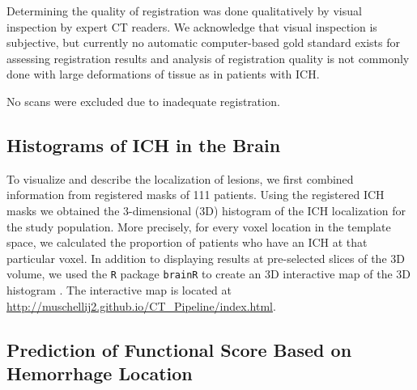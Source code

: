 \documentclass[10pt]{article}\usepackage[]{graphicx}\usepackage[]{color}
\begin{document}
Determining the quality of registration was done qualitatively by visual inspection by expert CT readers.   We acknowledge that visual inspection is subjective, but currently no automatic computer-based gold standard exists for assessing
registration results and analysis of registration quality is not commonly done with large deformations of tissue as in patients with ICH.  

No scans were excluded due to inadequate registration.





\subsection{Histograms of ICH in the Brain}

To visualize and describe the localization of lesions, we first combined information from registered masks of 111 patients.  Using the registered ICH masks we obtained the $3$-dimensional (3D) histogram of the ICH localization for the study population. More precisely, for every voxel location in the template space, we calculated the proportion of patients who have an ICH at that particular voxel.  In addition to displaying results at pre-selected slices of the 3D volume, we used the \verb|R| package \verb|brainR| to create an 3D interactive map of the 3D histogram \citep{brainr}.  The interactive map is located at \url{http://muschellij2.github.io/CT_Pipeline/index.html}.  


\subsection{Prediction of Functional Score Based on Hemorrhage Location}
\end{document}

